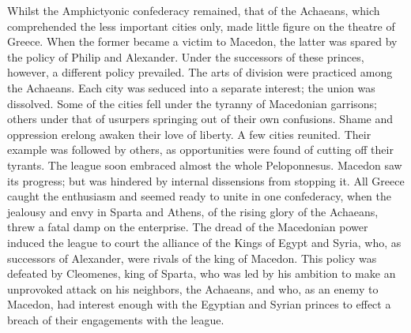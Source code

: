 Whilst the Amphictyonic confederacy remained, that of the Achaeans, which comprehended the less important cities only, made little figure on the theatre of Greece. 
When the former became a victim to Macedon, the latter was spared by the policy of Philip and Alexander. 
Under the successors of these princes, however, a different policy prevailed. 
The arts of division were practiced among the Achaeans. 
Each city was seduced into a separate interest; the union was dissolved. 
Some of the cities fell under the tyranny of Macedonian garrisons; others under that of usurpers springing out of their own confusions. 
Shame and oppression erelong awaken their love of liberty. 
A few cities reunited. 
Their example was followed by others, as opportunities were found of cutting off their tyrants. 
The league soon embraced almost the whole Peloponnesus. 
Macedon saw its progress; but was hindered by internal dissensions from stopping it. 
All Greece caught the enthusiasm and seemed ready to unite in one confederacy, when the jealousy and envy in Sparta and Athens, of the rising glory of the Achaeans, threw a fatal damp on the enterprise. 
The dread of the Macedonian power induced the league to court the alliance of the Kings of Egypt and Syria, who, as successors of Alexander, were rivals of the king of Macedon. 
This policy was defeated by Cleomenes, king of Sparta, who was led by his ambition to make an unprovoked attack on his neighbors, the Achaeans, and who, as an enemy to Macedon, had interest enough with the Egyptian and Syrian princes to effect a breach of their engagements with the league.


